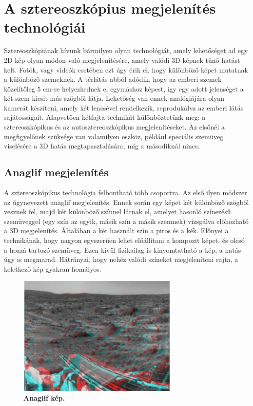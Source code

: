 \documentclass[12pt]{article}
\theoremstyle{plain}
\begin{document}
\section{A sztereoszkópius megjelenítés technológiái}

Sztereoszkópiának hívunk bármilyen olyan technológiát, amely lehetőséget ad egy 2D kép olyan módon való megjelenítésére, amely valódi 3D képnek tűnő hatást kelt. Fotók, vagy videók esetében ezt úgy érik el, hogy különböző képet mutatnak a különböző szemeknek. 
A térlátás abból adódik, hogy az emberi szemek közelítőleg 5 cm-re helyezkednek el egymáshoz képest, így egy adott jelenséget a két szem kicsit más szögből látja. Lehetőség van ennek analógiájára olyan kamerát készíteni, amely két lencsével rendelkezik, reprodukálva az emberi látás sajátosságait. Alapvetően kétfajta technikát különböztetünk meg: a sztereoszkópikus és az autosztereoszkópikus megjelenítéseket. Az elsőnél a megfigyelőnek szüksége van valamilyen eszköz, például speciális szemüveg viselésére a 3D hatás megtapasztalására, míg a másodiknál nincs. 
\subsection{Anaglif megjelenítés}
A sztereoszkópikus technológia felbontható több csoportra. Az első ilyen módszer az úgynevezett anaglif megjelenítés. Ennek során egy képet két különböző szögből vesznek fel, majd két különböző színnel látnak el, amelyet hasonló színezésű szemüveggel (egy szín az egyik, másik szín a másik szemnek) vizsgálva előhozható a 3D megjelenítés. Általában a két használt szín a piros és a kék. Előnyei a technikának, hogy nagyon egyszerűen lehet előállítani a kompozit képet, és olcsó a hozzá tartozó szemüveg. Ezen kívül fizikailag is kinyomtatható a kép, a hatás úgy is megmarad. Hátrányai, hogy nehéz valódi színeket megjeleníteni rajta, a keletkező kép gyakran homályos.

\begin{figure}[H]
   \centering
   \includegraphics[width=8cm, height=6cm]{media/stereo.PNG}
   \caption{\textbf{Anaglif kép.}}
   \label{fig:GeneralDiagram}
\end{figure}
\end{document}
